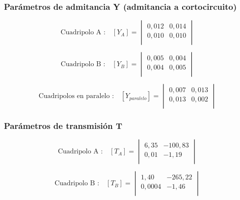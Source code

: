 \documentclass[a4paper]{article}
\begin{document}
\subsubsection*{Parámetros de admitancia Y (admitancia a cortocircuito)}

\begin{equation}
\text{Cuadripolo A :}\quad [Y_{A}] =
\begin{vmatrix}
	0,012 & 0,014\\
	0,010 & 0,010\\
\end{vmatrix}
\end{equation}

\begin{equation}
\text{Cuadripolo B :}\quad [Y_{B}] =
\begin{vmatrix}
	0,005 & 0,004\\
	0,004 & 0,005\\
\end{vmatrix}
\end{equation}

\begin{equation}
\text{Cuadripolos en paralelo :}\quad [Y_{paralelo}] =
\begin{vmatrix}
	0,007 & 0,013\\
	0,013 & 0,002\\
\end{vmatrix}
\end{equation}

\subsubsection*{Parámetros de transmisión T}

\begin{equation}
\text{Cuadripolo A :}\quad [T_{A}] =
\begin{vmatrix}
	6,35 & -100,83\\
	0,01 & -1,19\\
\end{vmatrix}
\end{equation}

\begin{equation}
\text{Cuadripolo B :}\quad [T_{B}] =
\begin{vmatrix}
	1,40 & -265,22\\
	0,0004 & -1,46\\
\end{vmatrix}
\end{equation}
\end{document}
